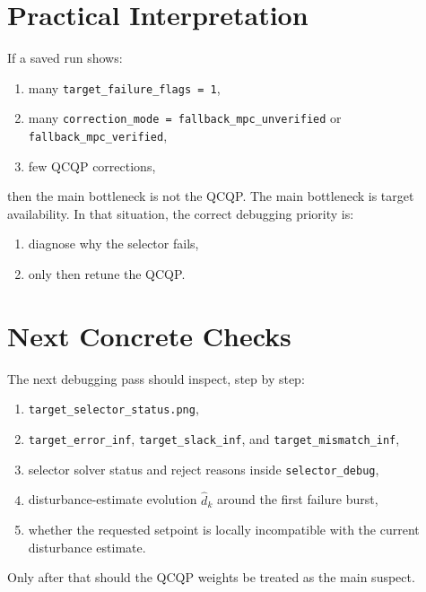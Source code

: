 \documentclass[11pt]{article}
\begin{document}
\section{Practical Interpretation}
If a saved run shows:
\begin{enumerate}
\item many \texttt{target\_failure\_flags = 1},
\item many \texttt{correction\_mode = fallback\_mpc\_unverified} or \texttt{fallback\_mpc\_verified},
\item few QCQP corrections,
\end{enumerate}
then the main bottleneck is not the QCQP. The main bottleneck is target availability. In that situation, the correct debugging priority is:
\begin{enumerate}
\item diagnose why the selector fails,
\item only then retune the QCQP.
\end{enumerate}

\section{Next Concrete Checks}
The next debugging pass should inspect, step by step:
\begin{enumerate}
\item \texttt{target\_selector\_status.png},
\item \texttt{target\_error\_inf}, \texttt{target\_slack\_inf}, and \texttt{target\_mismatch\_inf},
\item selector solver status and reject reasons inside \texttt{selector\_debug},
\item disturbance-estimate evolution $\hat d_k$ around the first failure burst,
\item whether the requested setpoint is locally incompatible with the current disturbance estimate.
\end{enumerate}
Only after that should the QCQP weights be treated as the main suspect.
\end{document}
